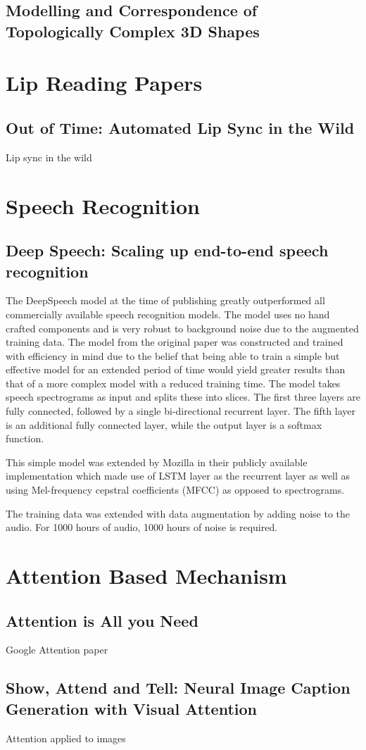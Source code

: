 \documentclass[12pt]{article}
\begin{document}
\subsection{Modelling and Correspondence of Topologically Complex 3D Shapes}
\cite{Alhashim2015}


\section{Lip Reading Papers}
\subsection{Out of Time: Automated Lip Sync in the Wild}
Lip sync in the wild \cite{Chung2016}


\section{Speech Recognition}
\subsection{Deep Speech: Scaling up end-to-end speech recognition}
The DeepSpeech model \cite{Hannun2014} at the time of publishing greatly outperformed all commercially available speech recognition models.
The model uses no hand crafted components and is very robust to background noise due to the augmented training data.
The model from the original paper was constructed and trained with efficiency in mind due to the belief that being able to train a simple but effective model for an extended period of time would yield greater results than that of a more complex model with a reduced training time.
The model takes speech spectrograms as input and splits these into slices.
The first three layers are fully connected, followed by a single bi-directional recurrent layer.
The fifth layer is an additional fully connected layer, while the output layer is a softmax function.

This simple model was extended by Mozilla in their publicly available implementation which made use of LSTM layer as the recurrent layer as well as using Mel-frequency cepstral coefficients (MFCC) as opposed to spectrograms.

The training data was extended with data augmentation by adding noise to the audio.
For 1000 hours of audio, 1000 hours of noise is required.


\section{Attention Based Mechanism}
\subsection{Attention is All you Need}
Google Attention paper \cite{Vaswani2017}

\subsection{Show, Attend and Tell: Neural Image Caption Generation with Visual
Attention}
Attention applied to images \cite{Xu2015}





\end{document}
